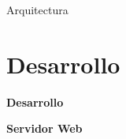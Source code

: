 \begin{frame}{Arquitectura}
    \vspace{0.5cm}
    \begin{figure}[ht]
       \centering
       \vspace{-0.50cm}
    \end{figure}

\end{frame}



\section{Desarrollo}
\begin{frame}
    \Huge
    \centering
    \textbf{Desarrollo}

\end{frame}


\begin{frame}
    \Huge
    \centering
    \textbf{Servidor Web}

\end{frame}

